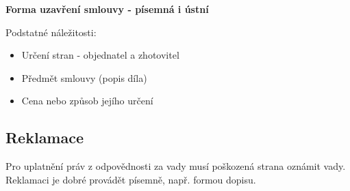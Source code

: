 \documentclass[11pt,a4paper,twoside]{book}
\begin{document}
	\textbf{Forma uzavření smlouvy - písemná i ústní}

	Podstatné náležitosti:
	\begin{itemize}
		\item Určení stran - objednatel a zhotovitel
		\item Předmět smlouvy (popis díla)
		\item Cena nebo způsob jejího určení	
	\end{itemize}

	\subsection*{Reklamace}
	Pro uplatnění práv z odpovědnosti za vady musí poškozená strana oznámit vady.
	Reklamaci je dobré provádět písemně, např. formou dopisu.
\end{document}
